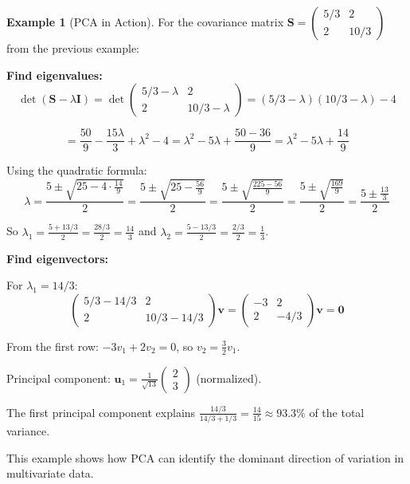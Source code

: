 \documentclass[12pt]{article}
\numberwithin{equation}{section}
\newcommand{\vect}[1]{\boldsymbol{#1}}   %
\newcommand{\mat}[1]{\mathbf{#1}}        %
\theoremstyle{plain}
\theoremstyle{definition}
\newtheorem{example}[theorem]{Example}
\theoremstyle{remark}
\begin{document}
\begin{example}[PCA in Action]
For the covariance matrix $\mat{S} = \begin{pmatrix} 5/3 & 2 \\ 2 & 10/3 \end{pmatrix}$ from the previous example:

\textbf{Find eigenvalues:}
$$\det(\mat{S} - \lambda\mat{I}) = \det\begin{pmatrix} 5/3-\lambda & 2 \\ 2 & 10/3-\lambda \end{pmatrix} = (5/3-\lambda)(10/3-\lambda) - 4$$

$$= \frac{50}{9} - \frac{15\lambda}{3} + \lambda^2 - 4 = \lambda^2 - 5\lambda + \frac{50-36}{9} = \lambda^2 - 5\lambda + \frac{14}{9}$$

Using the quadratic formula:
$$\lambda = \frac{5 \pm \sqrt{25 - 4 \cdot \frac{14}{9}}}{2} = \frac{5 \pm \sqrt{25 - \frac{56}{9}}}{2} = \frac{5 \pm \sqrt{\frac{225-56}{9}}}{2} = \frac{5 \pm \sqrt{\frac{169}{9}}}{2} = \frac{5 \pm \frac{13}{3}}{2}$$

So $\lambda_1 = \frac{5 + 13/3}{2} = \frac{28/3}{2} = \frac{14}{3}$ and $\lambda_2 = \frac{5 - 13/3}{2} = \frac{2/3}{2} = \frac{1}{3}$.

\textbf{Find eigenvectors:}

For $\lambda_1 = 14/3$:
$$\begin{pmatrix} 5/3 - 14/3 & 2 \\ 2 & 10/3 - 14/3 \end{pmatrix}\vect{v} = \begin{pmatrix} -3 & 2 \\ 2 & -4/3 \end{pmatrix}\vect{v} = \vect{0}$$

From the first row: $-3v_1 + 2v_2 = 0$, so $v_2 = \frac{3}{2}v_1$. 

Principal component: $\vect{u}_1 = \frac{1}{\sqrt{13}}\begin{pmatrix} 2 \\ 3 \end{pmatrix}$ (normalized).

The first principal component explains $\frac{14/3}{14/3 + 1/3} = \frac{14}{15} \approx 93.3\%$ of the total variance.

This example shows how PCA can identify the dominant direction of variation in multivariate data.
\end{example}
\end{document}
